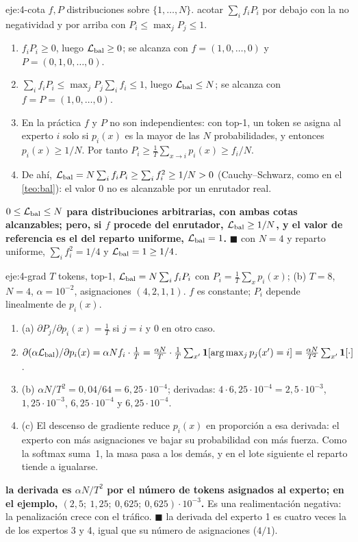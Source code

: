 \begin{solucion}{eje:4-cota}
\datos $f,P$ distribuciones sobre $\{1,\dots,N\}$.
\planteamiento acotar $\sum_if_iP_i$ por debajo con la no negatividad y por arriba con $P_i\le\max_jP_j\le 1$.
\pasos
\begin{enumerate}[label=\arabic*.]
  \item $f_iP_i\ge 0$, luego $\mathcal{L}_{\mathrm{bal}}\ge 0$; se alcanza con $f=(1,0,\dots,0)$ y $P=(0,1,0,\dots,0)$.
  \item $\sum_if_iP_i\le\max_jP_j\sum_if_i\le 1$, luego $\mathcal{L}_{\mathrm{bal}}\le N$; se alcanza con $f=P=(1,0,\dots,0)$.
  \item En la práctica $f$ y $P$ no son independientes: con top-1, un token se asigna al experto $i$ solo si $p_i(x)$ es la mayor de las $N$ probabilidades, y entonces $p_i(x)\ge 1/N$. Por tanto $P_i\ge\frac1T\sum_{x\to i}p_i(x)\ge f_i/N$.
  \item De ahí, $\mathcal{L}_{\mathrm{bal}}=N\sum_if_iP_i\ge\sum_if_i^{2}\ge 1/N>0$ (Cauchy--Schwarz, como en el \cref{teo:bal}): el valor $0$ no es alcanzable por un enrutador real.
\end{enumerate}
\resultado \textbf{$0\le\mathcal{L}_{\mathrm{bal}}\le N$ para distribuciones arbitrarias, con ambas cotas alcanzables; pero, si $f$ procede del enrutador, $\mathcal{L}_{\mathrm{bal}}\ge 1/N$, y el valor de referencia es el del reparto uniforme, $\mathcal{L}_{\mathrm{bal}}=1$.} $\blacksquare$
\comprobacion con $N=4$ y reparto uniforme, $\sum_if_i^{2}=1/4$ y $\mathcal{L}_{\mathrm{bal}}=1\ge 1/4$.
\end{solucion}

\begin{solucion}{eje:4-grad}
\datos $T$ tokens, top-1, $\mathcal{L}_{\mathrm{bal}}=N\sum_if_iP_i$ con $P_i=\frac1T\sum_xp_i(x)$; (b) $T=8$, $N=4$, $\alpha=10^{-2}$, asignaciones $(4,2,1,1)$.
\planteamiento $f$ es constante; $P_i$ depende linealmente de $p_i(x)$.
\pasos
\begin{enumerate}[label=\arabic*.]
  \item (a) $\partial P_j/\partial p_i(x)=\frac1T$ si $j=i$ y $0$ en otro caso.
  \item $\partial(\alpha\mathcal{L}_{\mathrm{bal}})/\partial p_i(x)=\alpha Nf_i\cdot\frac1T=\frac{\alpha N}{T}\cdot\frac1T\sum_{x'}\mathbf{1}[\arg\max_jp_j(x')=i]=\frac{\alpha N}{T^{2}}\sum_{x'}\mathbf{1}[\cdot]$.
  \item (b) $\alpha N/T^{2}=0{,}04/64=6{,}25\cdot 10^{-4}$; derivadas: $4\cdot 6{,}25\cdot 10^{-4}=2{,}5\cdot 10^{-3}$, $1{,}25\cdot 10^{-3}$, $6{,}25\cdot 10^{-4}$ y $6{,}25\cdot 10^{-4}$.
  \item (c) El descenso de gradiente reduce $p_i(x)$ en proporción a esa derivada: el experto con más asignaciones ve bajar su probabilidad con más fuerza. Como la softmax suma~1, la masa pasa a los demás, y en el lote siguiente el reparto tiende a igualarse.
\end{enumerate}
\resultado \textbf{la derivada es $\alpha N/T^{2}$ por el número de tokens asignados al experto; en el ejemplo, $(2{,}5;\ 1{,}25;\ 0{,}625;\ 0{,}625)\cdot 10^{-3}$.} Es una realimentación negativa: la penalización crece con el tráfico. $\blacksquare$
\comprobacion la derivada del experto 1 es cuatro veces la de los expertos 3 y 4, igual que su número de asignaciones ($4/1$).
\end{solucion}

